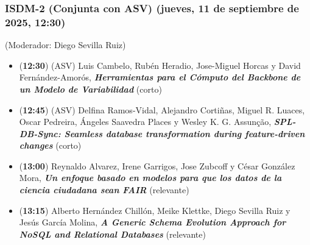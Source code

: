 \begin{frame}
  \frametitle{ISDM-2 (Conjunta con ASV) (jueves, 11 de septiembre de 2025, 12:30)}
{\small (Moderador: Diego Sevilla Ruiz)}
\begin{itemize}

\item ({\bf 12:30}) (ASV) Luis Cambelo, Rubén Heradio, Jose-Miguel Horcas y David Fernández-Amorós, %
      {\bfseries\itshape Herramientas para el Cómputo del Backbone de un Modelo de Variabilidad} %
      (corto)

\item ({\bf 12:45}) (ASV) Delfina Ramos-Vidal, Alejandro Cortiñas, Miguel R. Luaces, Oscar Pedreira, Ángeles Saavedra Places y Wesley K. G. Assunção, %
      {\bfseries\itshape SPL-DB-Sync: Seamless database transformation during feature-driven changes} %
      (corto)

\item ({\bf 13:00}) Reynaldo Alvarez, Irene Garrigos, Jose Zubcoff y César González Mora, %
      {\bfseries\itshape Un enfoque basado en modelos para que los datos de la ciencia ciudadana sean FAIR} %
      (relevante)

\item ({\bf 13:15}) Alberto Hernández Chillón, Meike Klettke, Diego Sevilla Ruiz y Jesús García Molina, %
      {\bfseries\itshape A Generic Schema Evolution Approach for NoSQL and Relational Databases} %
      (relevante)

\end{itemize}
\end{frame}